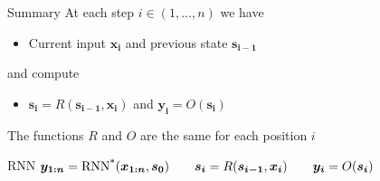 \documentclass[12pt,aspectratio=169,handout]{beamer}
\begin{document}
\begin{frame}{Summary}
At each step $i \in (1, \ldots, n)$ we have
\begin{itemize}
	\item Current input $\bm{x_i}$ and previous state $\bm{s_{i - 1}}$
\end{itemize}
and compute
\begin{itemize}
	\item $\bm{s_i} = R(\bm{s_{i-1}}, \bm{x_i})$ and $\bm{y_i}  = O(\bm{s_i})$
\end{itemize}

The functions $R$ and $O$ are the same for each position $i$

\begin{block}{RNN}
	$\bm{y_{1:n}} = \operatorname*{RNN^{*}} (\bm{x_{1:n}}, \bm{s_0})
	\qquad
	\bm{s_i} = R(\bm{s_{i-1}}, \bm{x_i})
	\qquad
	\bm{y_i}  = O(\bm{s_i})$
\end{block}


\end{frame}
\end{document}
